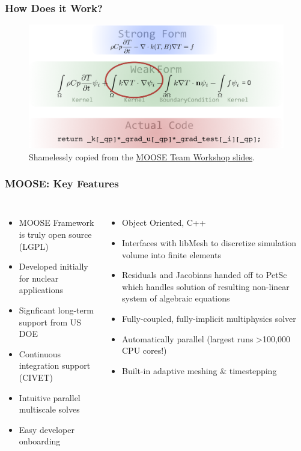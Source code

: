 \begin{frame}
        \frametitle{How Does it Work?}
  \begin{figure}
   \vspace{-0.05in}
   \hspace*{-0.15in}
   \includegraphics[width=\textwidth]{./images/moose_code.png}
          \caption{Shamelessly copied from the 
          \href{https://mooseframework.inl.gov/workshop/\#/2/7}{MOOSE Team Workshop slides}.}
    \end{figure}
\end{frame}

\begin{frame}
        \frametitle{MOOSE: Key Features}
        \begin{columns}
                \column[t]{5.5cm}
               \begin{itemize}
               \item MOOSE Framework is truly open source (LGPL)
               \item Developed initially for nuclear applications 
               \item Signficant long-term support from US DOE
               \item Continuous integration support (CIVET)
               \item Intuitive parallel multiscale solves
               \item Easy developer onboarding
               \end{itemize}
                \column[t]{5.5cm}
               \begin{itemize}
               \item Object Oriented, C++
               \item Interfaces with libMesh to discretize simulation volume into finite elements
               \item Residuals and Jacobians handed off to PetSc which handles solution of resulting non-linear system of algebraic equations
               \item Fully-coupled, fully-implicit multiphysics solver
               \item Automatically parallel (largest runs \textgreater 100,000 CPU cores!)
               \item Built-in adaptive meshing \& timestepping 
               \end{itemize}
        \end{columns}

\end{frame}

